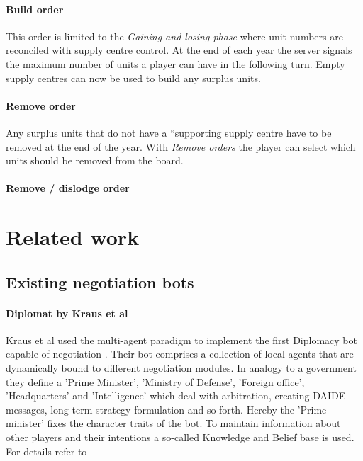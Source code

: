 \documentclass[pdftex,12pt,a4paper]{report}
\begin{document}
\paragraph{Build order}
This order is limited to the \textit{Gaining and losing phase} where unit numbers
are reconciled with supply centre control. At the end of each year the
server signals the maximum number of units a player can have in the following
turn. Empty supply centres can now be used to build any surplus units.

\paragraph{Remove order}
Any surplus units that do not have a ``supporting supply centre have to be removed
at the end of the year. With \textit{Remove orders} the player can select which
units should be removed from the board.

\paragraph{Remove / dislodge order}



\pagebreak

\section{Related work}

\subsection{Existing negotiation bots}

\paragraph{Diplomat by Kraus et al}

Kraus et al used the multi-agent paradigm to implement the first
Diplomacy bot capable of negotiation \cite{Kraus95}. Their bot
comprises a collection of local agents that are dynamically bound to
different negotiation modules. In analogy to a government they define
a 'Prime Minister', 'Ministry of Defense', 'Foreign office',
'Headquarters' and 'Intelligence' which deal with arbitration,
creating DAIDE messages, long-term strategy formulation and so
forth. Hereby the 'Prime minister' fixes the character traits of the
bot. To maintain information about other players and their intentions
a so-called Knowledge and Belief base is used. For details refer to
\cite{Kraus88}
\end{document}
